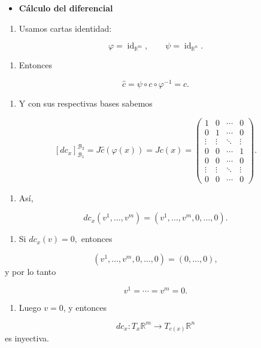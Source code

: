 \begin{bookproof}{}
\begin{itemize}
\item \textbf{Cálculo del diferencial}
\end{itemize}
\begin{enumerate}
\item Usamos cartas identidad:
\end{enumerate}
\[
\varphi=\operatorname{id}_{\mathbb R^m},\qquad \psi=\operatorname{id}_{\mathbb R^n}.
\]
\begin{enumerate}[start=2]
\item Entonces
\end{enumerate}
\[
\widehat c=\psi\circ c\circ\varphi^{-1}=c.
\]
\begin{enumerate}[start=3]
\item Y con sus respectivas bases sabemos
\end{enumerate}
\[
[dc_{x}]_{\mathcal{B_{1}}}^{\mathcal{B_{2}}}=J\widehat c(\varphi(x))=Jc(x)=\begin{pmatrix}1&0&\cdots&0\\0&1&\cdots&0\\\vdots&\vdots&\ddots&\vdots\\0&0&\cdots&1\\0&0&\cdots&0\\\vdots&\vdots&\ddots&\vdots\\0&0&\cdots&0\end{pmatrix}.
\]
\begin{enumerate}[start=4]
\item Así,
\end{enumerate}
\[
dc_x(v^1,\dots,v^m)=(v^1,\dots,v^m,0,\dots,0).
\]
\begin{enumerate}[start=5]
\item Si $dc_x(v)=0,$ entonces
\end{enumerate}
\[
(v^1,\dots,v^m,0,\dots,0)=(0,\dots,0),
\]
y por lo tanto

\[
v^1=\cdots=v^m=0.
\]
\begin{enumerate}[start=6]
\item Luego $v=0$, y entonces
\end{enumerate}
\[
dc_x:T_x\mathbb R^m\to T_{c(x)}\mathbb R^n
\]
es inyectiva.


\end{bookproof}
